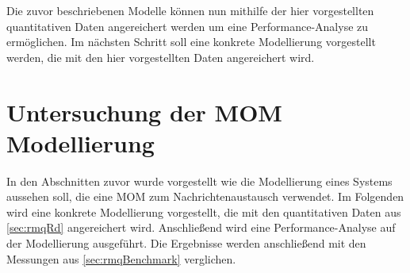 Die zuvor beschriebenen Modelle können nun mithilfe der hier vorgestellten quantitativen Daten angereichert werden um eine Performance-Analyse zu ermöglichen. Im nächsten Schritt soll eine konkrete Modellierung vorgestellt werden, die mit den hier vorgestellten Daten angereichert wird. 










\section{Untersuchung der MOM Modellierung}
In den Abschnitten zuvor wurde vorgestellt wie die Modellierung eines Systems aussehen soll, die eine MOM zum Nachrichtenaustausch verwendet. Im Folgenden wird eine konkrete Modellierung vorgestellt, die mit den quantitativen Daten aus \autoref{sec:rmqRd} angereichert wird. Anschließend wird eine Performance-Analyse auf der Modellierung ausgeführt. Die Ergebnisse werden anschließend mit den Messungen aus \autoref{sec:rmqBenchmark} verglichen.

